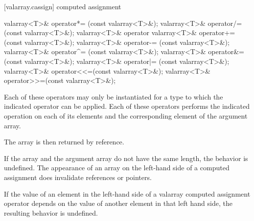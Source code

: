 [valarray.cassign]{ computed assignment}

%
%
%
%
%
%
%
%
%
%
\begin{itemdecl}
valarray<T>& operator*= (const valarray<T>&);
valarray<T>& operator/= (const valarray<T>&);
valarray<T>& operator%
valarray<T>& operator+= (const valarray<T>&);
valarray<T>& operator-= (const valarray<T>&);
valarray<T>& operator^= (const valarray<T>&);
valarray<T>& operator&= (const valarray<T>&);
valarray<T>& operator|= (const valarray<T>&);
valarray<T>& operator<<=(const valarray<T>&);
valarray<T>& operator>>=(const valarray<T>&);
\end{itemdecl}

\begin{itemdescr}
\pnum
Each of these operators may only be instantiated for a type 
to which the indicated operator can be applied.
Each of these operators
performs the indicated operation on each of its elements and the
corresponding element of the argument array.

\pnum
The array is then returned by reference.

\pnum
If the array and the
argument array do not have the same length, the behavior is undefined.%
The appearance of an array on the left-hand side of a computed assignment
does  invalidate references or pointers.

\pnum
If the value of an element in the left-hand side of a valarray computed
assignment operator depends on the value of another element in that left
hand side, the resulting behavior is undefined.
\end{itemdescr}

